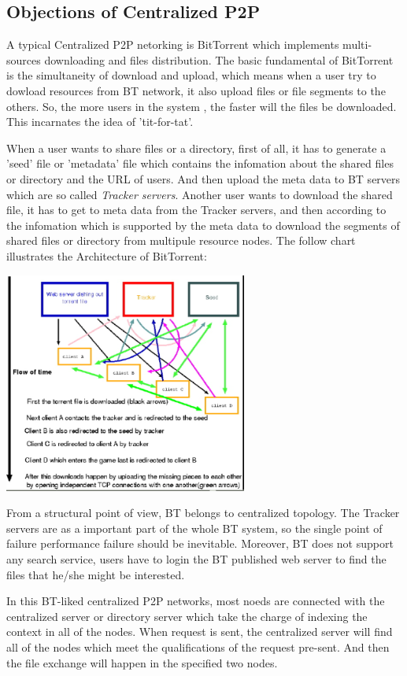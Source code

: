 \subsection{Objections of Centralized P2P}
{
A typical Centralized P2P netorking is BitTorrent which implements multi-sources downloading and files distribution.
The basic fundamental of BitTorrent is the simultaneity of download and upload, which means when a user try to dowload resources from BT network, it also upload files or file segments to the others. So, the more users in the system , the faster will the files be downloaded. This incarnates the idea of 'tit-for-tat'.

When a user wants to share files or a directory, first of all, it has to generate a 'seed' file or 'metadata' file which contains the infomation about the shared files or directory and the URL of users.
And then upload the meta data to BT servers which are so called \emph{Tracker servers}.
Another user wants to download the shared file, it has to get to meta data from the Tracker servers, and then according to the infomation which is supported by the meta data to download the segments of shared files or directory from multipule resource nodes.
The follow chart illustrates the Architecture of BitTorrent:
\begin{center}
\includegraphics[width=8cm]{data/bittorrentprotocol.png}
\end{center}

From a structural point of view, BT belongs to centralized topology.
The Tracker servers are as a important part of the whole BT system, so the single point of failure performance failure should be inevitable. Moreover, BT does not support any search service, users have to login the BT published web server to find the files that he/she might be interested.

In this BT-liked centralized P2P networks, most noeds are connected with the centralized server or directory server which take the charge of indexing the context in all of the nodes. 
When request is sent, the centralized server will find all of the nodes which meet the qualifications of the request pre-sent. 
And then the file exchange will happen in the specified two nodes.

}
